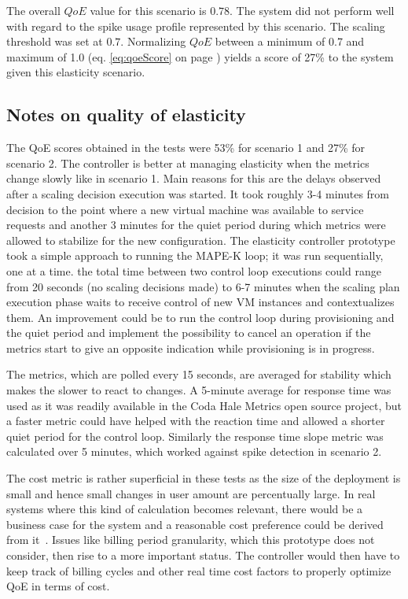 \documentclass[english]{tktltiki2}
\theoremstyle{definition}
\theoremstyle{remark}
\begin{document}
The overall $QoE$ value for this scenario is $0.78$. The system did not perform
well with regard to the spike usage profile represented by this scenario. The
scaling threshold was set at $0.7$. Normalizing $QoE$ between a minimum of 0.7
and maximum of 1.0 (eq. \ref{eq:qoeScore} on page \pageref{eq:qoeScore}) yields
a score of 27\% to the system given this elasticity scenario.

\subsection{Notes on quality of elasticity}

The QoE scores obtained in the tests were 53\% for scenario 1 and 27\% for
scenario 2. The controller is better at managing elasticity when the metrics
change slowly like in scenario 1. Main reasons for this are the delays observed
after a scaling decision execution was started. It took roughly 3-4 minutes from
decision to the point where a new virtual machine was available to service
requests and another 3 minutes for the quiet period during which metrics were
allowed to stabilize for the new configuration. The elasticity controller
prototype took a simple approach to running the MAPE-K loop; it was run
sequentially, one at a time. the total time between two control loop executions
could range from 20 seconds (no scaling decisions made) to 6-7 minutes when the
scaling plan execution phase waits to receive control of new VM instances and
contextualizes them. An improvement could be to run the control loop during
provisioning and the quiet period and implement the possibility to cancel an
operation if the metrics start to give an opposite indication while provisioning
is in progress.

The metrics, which are polled every 15 seconds, are averaged for stability which
makes the slower to react to changes. A 5-minute average for response time was
used as it was readily available in the Coda Hale Metrics open source project,
but a faster metric could have helped with the reaction time and allowed a
shorter quiet period for the control loop. Similarly the response time slope
metric was calculated over 5 minutes, which worked against spike detection in
scenario 2.

The cost metric is rather superficial in these tests as the size of the
deployment is small and hence small changes in user amount are percentually
large. In real systems where this kind of calculation becomes relevant, there
would be a business case for the system and a reasonable cost preference could be
derived from it~\cite{Suleiman2011}. Issues like billing period granularity,
which this prototype does not consider, then rise to a more important status.
The controller would then have to keep track of billing cycles and other real
time cost factors to properly optimize QoE in terms of cost.
\end{document}
